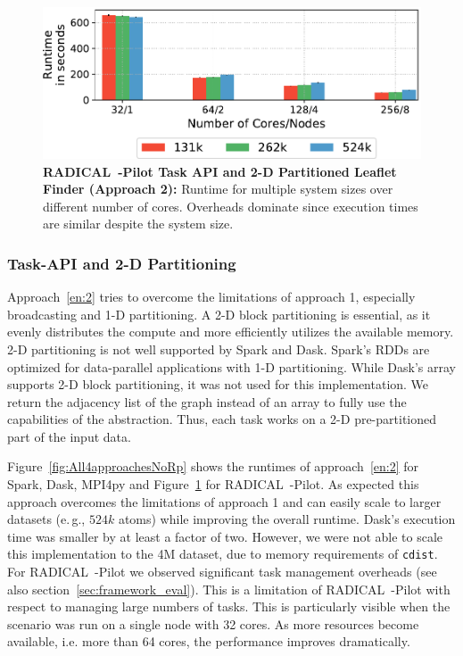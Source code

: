 

\begin{figure}[ht]
    \centering
    \includegraphics[width=.95\textwidth]{figures/data_analytics_hpc/task_par/rpLF.pdf}
    \caption{\textbf{RADICAL~-Pilot Task API and 2-D Partitioned Leaflet Finder (Approach 2):}
    Runtime for multiple system sizes over different number of cores.
    Overheads dominate since execution times are similar despite the system size.}
    \label{fig:rpLF}
\end{figure}

\subsubsection*{Task-API and 2-D Partitioning}
Approach~\ref{en:2} tries to overcome the limitations of approach 1, especially broadcasting and 1-D partitioning.
A 2-D block partitioning is essential, as it evenly distributes the compute and more efficiently utilizes the available memory.
2-D partitioning is not well supported by Spark and Dask.
Spark's RDDs are optimized for data-parallel applications with 1-D partitioning.
While Dask's array supports 2-D block partitioning, it was not used for this implementation.
We return the adjacency list of the graph instead of an array to fully use the capabilities of the abstraction.
Thus, each task works on a 2-D pre-partitioned part of the input data.

Figure~\ref{fig:All4approachesNoRp} shows the runtimes of approach~\ref{en:2} for Spark, Dask, MPI4py and Figure~\ref{fig:rpLF} for RADICAL~-Pilot.
As expected this approach overcomes the limitations of approach 1 and can easily scale to larger datasets (e.\,g., $524k$ atoms) while improving the overall runtime.
Dask's execution time was smaller by at least a factor of two.
However, we were not able to scale this implementation to the 4M dataset, due to memory requirements of \texttt{cdist}.
For RADICAL~-Pilot we observed significant task management overheads (see also section~\ref{sec:framework_eval}).
This is a limitation of RADICAL~-Pilot with respect to managing large numbers of tasks.
This is particularly visible when the scenario was run on a single node with 32 cores.
As more resources become available, i.e. more than 64 cores, the performance improves dramatically.

